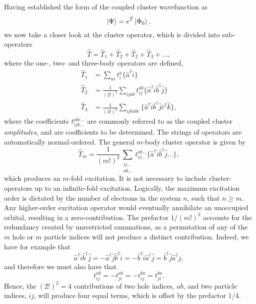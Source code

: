 Having established the form of the coupled cluster wavefunction as 
\begin{equation}
    \ket{\Psi} = e^{\hat{T}} \ket{\Phi_0},
\end{equation}
we now take a closer look at the cluster operator, which is divided into sub-operators 
\begin{equation}
    \hat{T} = \hat{T}_1 +  \hat{T}_2 + \hat{T}_2 + \hat{T}_3 + \dots,
\end{equation}
where the one-, two- and three-body operators are defined,
\begin{align}
    \hat{T}_1 &= \sum_{ai}t^a_i\{\hat{a}^\dagger \hat{i} \} \\
    \hat{T}_2 &= \frac{1}{(2!)^2}\sum_{ijab} t^{ab}_{ij} 
        \{\hat{a}^\dagger \hat{i} \hat{b}^\dagger \hat{j} \} \\
    \hat{T}_3 &= \frac{1}{(3!)^2} \sum_{ijkabc} 
        \{\hat{a}^\dagger \hat{i} \hat{b}^\dagger \hat{j} \hat{c}^\dagger \hat{k} \},
\end{align}
where the coefficients $t^{abc\dots}_{ijk\dots}$ are commonly referred to as the 
coupled cluster \emph{amplitudes}, and are coefficients to be determined. The strings 
of operators are automatically normal-ordered. The general $m$-body cluster operator 
is given by 
\begin{equation}
    \hat{T}_m = \frac{1}{(m!)^2} \sum_{\substack{ij\dots \\ ab \dots}}
        t^{ab\dots}_{ij\dots} \{\hat{a}^\dagger \hat{i} \hat{b}^\dagger \hat{j} \dots\},
\end{equation}
which produces an $m$-fold excitation. It is not necessary to include cluster-operators
up to an infinite-fold excitation. Logically, the maximum excitation order is dictated by the number 
of electrons in the system $n$, such that $n \geq m$. Any higher-order excitation operator
would eventually annihilate an unoccupied orbital, resulting in a zero-contribution.
The prefactor $1/(m!)^2$ accounts for the redundancy created by unrestricted summations,
as a permutation of any of the $m$ hole or $m$ particle indices will not produce a 
distinct contribution. Indeed, we have for example that
\begin{equation}
    \hat{a}^\dagger \hat{i} \hat{b}^\dagger \hat{j} 
    = - \hat{a}^\dagger \hat{j} \hat{b}^\dagger \hat{i}
    = - \hat{b}^\dagger \hat{i} \hat{a}^\dagger \hat{j} 
    = \hat{b}^\dagger \hat{j} \hat{a}^\dagger \hat{j},
\end{equation}
and therefore we must also have that 
\begin{equation}
    t^{ab}_{ij} = - t^{ab}_{ji} = -t^{ba}_{ij} = t^{ba}_{ji}.
\end{equation}
Hence, the $(2!)^2 = 4$ contributions of two hole indices, $ab$, and two particle indices,
$ij$, will produce four equal terms, which is offset by the prefactor $1/4$.

